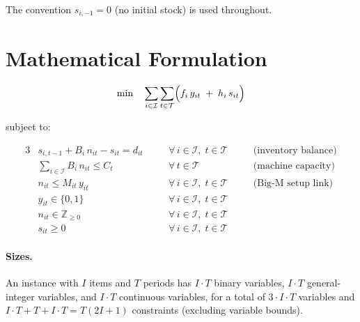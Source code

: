 \documentclass[11pt,a4paper]{article}
\begin{document}
The convention $s_{i,-1}=0$ (no initial stock) is used throughout.

\section{Mathematical Formulation}

\begin{equation}\label{eq:obj}
\min \quad \sum_{i\in\mathcal{I}}\sum_{t\in\mathcal{T}}
  \Bigl( f_i\, y_{it} \;+\; h_i\, s_{it} \Bigr)
\end{equation}

\noindent subject to:

\begin{alignat}{3}
  &s_{i,t-1} + B_i\, n_{it} - s_{it} = d_{it}
  &&\quad\forall\, i\in\mathcal{I},\; t\in\mathcal{T}
  &&\quad\text{(inventory balance)}\label{eq:inv}\\[4pt]
  &\sum_{i\in\mathcal{I}} B_i\, n_{it} \le C_t
  &&\quad\forall\, t\in\mathcal{T}
  &&\quad\text{(machine capacity)}\label{eq:cap}\\[4pt]
  &n_{it} \le M_{it}\, y_{it}
  &&\quad\forall\, i\in\mathcal{I},\; t\in\mathcal{T}
  &&\quad\text{(Big-M setup link)}\label{eq:bigm}\\[4pt]
  &y_{it} \in \{0,1\}
  &&\quad\forall\, i\in\mathcal{I},\; t\in\mathcal{T}
  &&\\[2pt]
  &n_{it} \in \mathbb{Z}_{\ge 0}
  &&\quad\forall\, i\in\mathcal{I},\; t\in\mathcal{T}
  &&\\[2pt]
  &s_{it} \ge 0
  &&\quad\forall\, i\in\mathcal{I},\; t\in\mathcal{T}
  &&
\end{alignat}

\paragraph{Sizes.}
An instance with $I$ items and $T$ periods has
$I\cdot T$ binary variables, $I\cdot T$ general-integer variables,
and $I\cdot T$ continuous variables,
for a total of $3\cdot I\cdot T$ variables and
$I\cdot T + T + I\cdot T = T(2I+1)$ constraints
(excluding variable bounds).

\end{document}
